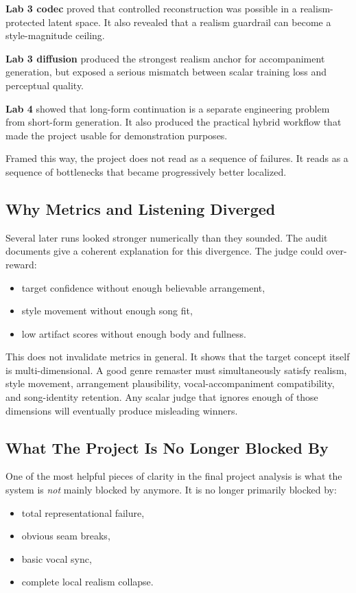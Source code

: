 \documentclass[conference]{IEEEtran}
\begin{document}
\textbf{Lab 3 codec} proved that controlled reconstruction was possible in a realism-protected latent space. It also revealed that a realism guardrail can become a style-magnitude ceiling.

\textbf{Lab 3 diffusion} produced the strongest realism anchor for accompaniment generation, but exposed a serious mismatch between scalar training loss and perceptual quality.

\textbf{Lab 4} showed that long-form continuation is a separate engineering problem from short-form generation. It also produced the practical hybrid workflow that made the project usable for demonstration purposes.

Framed this way, the project does not read as a sequence of failures. It reads as a sequence of bottlenecks that became progressively better localized.

\subsection{Why Metrics and Listening Diverged}
Several later runs looked stronger numerically than they sounded. The audit documents give a coherent explanation for this divergence. The judge could over-reward:
\begin{itemize}[leftmargin=1.5em]
    \item target confidence without enough believable arrangement,
    \item style movement without enough song fit,
    \item low artifact scores without enough body and fullness.
\end{itemize}

This does not invalidate metrics in general. It shows that the target concept itself is multi-dimensional. A good genre remaster must simultaneously satisfy realism, style movement, arrangement plausibility, vocal-accompaniment compatibility, and song-identity retention. Any scalar judge that ignores enough of those dimensions will eventually produce misleading winners.

\subsection{What The Project Is No Longer Blocked By}
One of the most helpful pieces of clarity in the final project analysis is what the system is \emph{not} mainly blocked by anymore. It is no longer primarily blocked by:
\begin{itemize}[leftmargin=1.5em]
    \item total representational failure,
    \item obvious seam breaks,
    \item basic vocal sync,
    \item complete local realism collapse.
\end{itemize}
\end{document}
